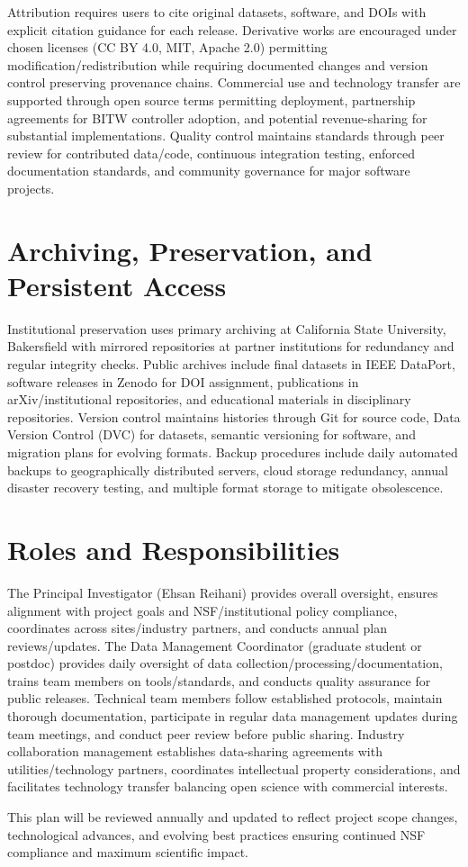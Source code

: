 \documentclass[12pt]{article}
\begin{document}
Attribution requires users to cite original datasets, software, and DOIs with explicit citation guidance for each release. Derivative works are encouraged under chosen licenses (CC BY 4.0, MIT, Apache 2.0) permitting modification/redistribution while requiring documented changes and version control preserving provenance chains. Commercial use and technology transfer are supported through open source terms permitting deployment, partnership agreements for BITW controller adoption, and potential revenue-sharing for substantial implementations. Quality control maintains standards through peer review for contributed data/code, continuous integration testing, enforced documentation standards, and community governance for major software projects.

\section{Archiving, Preservation, and Persistent Access}

Institutional preservation uses primary archiving at California State University, Bakersfield with mirrored repositories at partner institutions for redundancy and regular integrity checks. Public archives include final datasets in IEEE DataPort, software releases in Zenodo for DOI assignment, publications in arXiv/institutional repositories, and educational materials in disciplinary repositories. Version control maintains histories through Git for source code, Data Version Control (DVC) for datasets, semantic versioning for software, and migration plans for evolving formats. Backup procedures include daily automated backups to geographically distributed servers, cloud storage redundancy, annual disaster recovery testing, and multiple format storage to mitigate obsolescence.

\section{Roles and Responsibilities}

The Principal Investigator (Ehsan Reihani) provides overall oversight, ensures alignment with project goals and NSF/institutional policy compliance, coordinates across sites/industry partners, and conducts annual plan reviews/updates. The Data Management Coordinator (graduate student or postdoc) provides daily oversight of data collection/processing/documentation, trains team members on tools/standards, and conducts quality assurance for public releases. Technical team members follow established protocols, maintain thorough documentation, participate in regular data management updates during team meetings, and conduct peer review before public sharing. Industry collaboration management establishes data-sharing agreements with utilities/technology partners, coordinates intellectual property considerations, and facilitates technology transfer balancing open science with commercial interests.

This plan will be reviewed annually and updated to reflect project scope changes, technological advances, and evolving best practices ensuring continued NSF compliance and maximum scientific impact.
\end{document}
